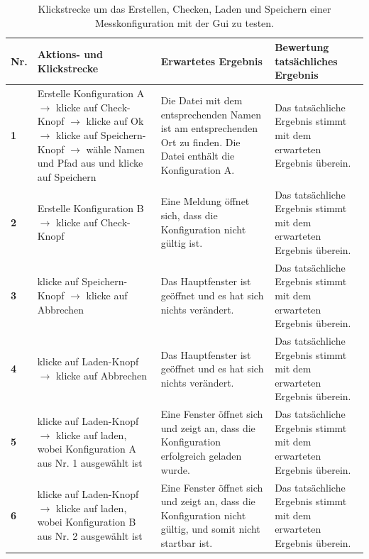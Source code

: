 \documentclass[parskip=full]{scrartcl}
\begin{document}
\begin{table}[h]
\begin{tabular}{| p{} | p{} | p{} | p{} |}
	\hline
	\textbf{Nr.} & \textbf{Aktions- und Klickstrecke} & \textbf{Erwartetes Ergebnis}  & \textbf{ Bewertung tatsächliches Ergebnis} \\ \hline
	\textbf{1}
	& 
	Erstelle Konfiguration A $\rightarrow$ klicke auf Check-Knopf $\rightarrow$ klicke auf Ok $\rightarrow$ klicke auf Speichern-Knopf $\rightarrow$ wähle Namen und Pfad aus und klicke auf Speichern 
	&
	Die Datei mit dem entsprechenden Namen ist am entsprechenden Ort zu finden. Die Datei enthält die Konfiguration A.
	& 
	Das tatsächliche Ergebnis stimmt mit dem erwarteten Ergebnis überein. 
	\\ \hline
	
	\textbf{2}
	& 
	Erstelle Konfiguration B $\rightarrow$ klicke auf Check-Knopf
	&
	Eine Meldung öffnet sich, dass die Konfiguration nicht gültig ist.
	& 
	Das tatsächliche Ergebnis stimmt mit dem erwarteten Ergebnis überein. 
	\\ \hline
	
	\textbf{3}
	& 
	klicke auf Speichern-Knopf $\rightarrow$ klicke auf Abbrechen
	&
	Das Hauptfenster ist geöffnet und es hat sich nichts verändert.
	& 
	Das tatsächliche Ergebnis stimmt mit dem erwarteten Ergebnis überein.
	\\ \hline
	
	\textbf{4}
	& 
	klicke auf Laden-Knopf $\rightarrow$ klicke auf Abbrechen
	&
	Das Hauptfenster ist geöffnet und es hat sich nichts verändert.
	& 
	Das tatsächliche Ergebnis stimmt mit dem erwarteten Ergebnis überein.
	\\ \hline
	
	\textbf{5}
	& 
	klicke auf Laden-Knopf $\rightarrow$ klicke auf laden, wobei Konfiguration A aus Nr. 1 ausgewählt ist
	&
	Eine Fenster öffnet sich und zeigt an, dass die Konfiguration erfolgreich geladen wurde.
	& 
	Das tatsächliche Ergebnis stimmt mit dem erwarteten Ergebnis überein.
	\\ \hline
	\textbf{6}
	& 
	klicke auf Laden-Knopf $\rightarrow$ klicke auf laden, wobei Konfiguration B aus Nr. 2 ausgewählt ist
	&
	Eine Fenster öffnet sich und zeigt an, dass die Konfiguration nicht gültig, und somit nicht startbar ist.
	& 
	Das tatsächliche Ergebnis stimmt mit dem erwarteten Ergebnis überein.
	\\ \hline
		
	
	
\end{tabular}

\caption{Klickstrecke um das Erstellen, Checken, Laden und Speichern einer Messkonfiguration mit der Gui zu testen.}
\label{klickConfig}
\end{table}
\end{document}
